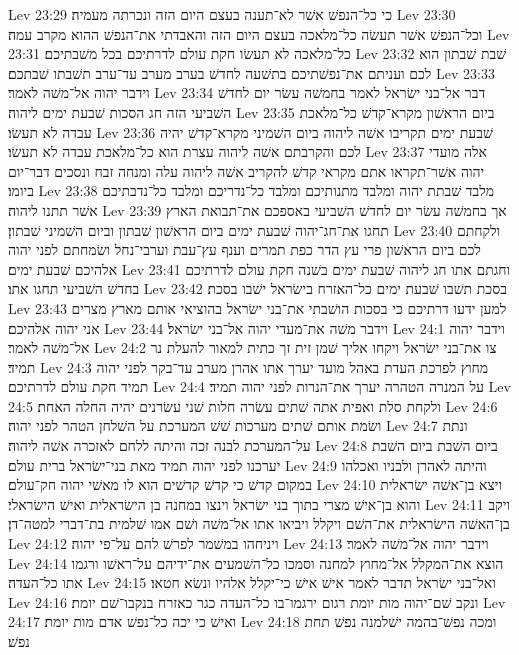 Lev 23:29  כי כל־הנפשׁ אשׁר לא־תענה בעצם היום הזה ונכרתה מעמיה׃
Lev 23:30  וכל־הנפשׁ אשׁר תעשׂה כל־מלאכה בעצם היום הזה והאבדתי את־הנפשׁ ההוא מקרב עמה׃
Lev 23:31  כל־מלאכה לא תעשׂו חקת עולם לדרתיכם בכל משׁבתיכם׃
Lev 23:32  שׁבת שׁבתון הוא לכם ועניתם את־נפשׁתיכם בתשׁעה לחדשׁ בערב מערב עד־ערב תשׁבתו שׁבתכם׃
Lev 23:33  וידבר יהוה אל־משׁה לאמר׃
Lev 23:34  דבר אל־בני ישׂראל לאמר בחמשׁה עשׂר יום לחדשׁ השׁביעי הזה חג הסכות שׁבעת ימים ליהוה׃
Lev 23:35  ביום הראשׁון מקרא־קדשׁ כל־מלאכת עבדה לא תעשׂו׃
Lev 23:36  שׁבעת ימים תקריבו אשׁה ליהוה ביום השׁמיני מקרא־קדשׁ יהיה לכם והקרבתם אשׁה ליהוה עצרת הוא כל־מלאכת עבדה לא תעשׂו׃
Lev 23:37  אלה מועדי יהוה אשׁר־תקראו אתם מקראי קדשׁ להקריב אשׁה ליהוה עלה ומנחה זבח ונסכים דבר־יום ביומו׃
Lev 23:38  מלבד שׁבתת יהוה ומלבד מתנותיכם ומלבד כל־נדריכם ומלבד כל־נדבתיכם אשׁר תתנו ליהוה׃
Lev 23:39  אך בחמשׁה עשׂר יום לחדשׁ השׁביעי באספכם את־תבואת הארץ תחגו את־חג־יהוה שׁבעת ימים ביום הראשׁון שׁבתון וביום השׁמיני שׁבתון׃
Lev 23:40  ולקחתם לכם ביום הראשׁון פרי עץ הדר כפת תמרים וענף עץ־עבת וערבי־נחל ושׂמחתם לפני יהוה אלהיכם שׁבעת ימים׃
Lev 23:41  וחגתם אתו חג ליהוה שׁבעת ימים בשׁנה חקת עולם לדרתיכם בחדשׁ השׁביעי תחגו אתו׃
Lev 23:42  בסכת תשׁבו שׁבעת ימים כל־האזרח בישׂראל ישׁבו בסכת׃
Lev 23:43  למען ידעו דרתיכם כי בסכות הושׁבתי את־בני ישׂראל בהוציאי אותם מארץ מצרים אני יהוה אלהיכם׃
Lev 23:44  וידבר משׁה את־מעדי יהוה אל־בני ישׂראל׃
Lev 24:1  וידבר יהוה אל־משׁה לאמר׃
Lev 24:2  צו את־בני ישׂראל ויקחו אליך שׁמן זית זך כתית למאור להעלת נר תמיד׃
Lev 24:3  מחוץ לפרכת העדת באהל מועד יערך אתו אהרן מערב עד־בקר לפני יהוה תמיד חקת עולם לדרתיכם׃
Lev 24:4  על המנרה הטהרה יערך את־הנרות לפני יהוה תמיד׃
Lev 24:5  ולקחת סלת ואפית אתה שׁתים עשׂרה חלות שׁני עשׂרנים יהיה החלה האחת׃
Lev 24:6  ושׂמת אותם שׁתים מערכות שׁשׁ המערכת על השׁלחן הטהר לפני יהוה׃
Lev 24:7  ונתת על־המערכת לבנה זכה והיתה ללחם לאזכרה אשׁה ליהוה׃
Lev 24:8  ביום השׁבת ביום השׁבת יערכנו לפני יהוה תמיד מאת בני־ישׂראל ברית עולם׃
Lev 24:9  והיתה לאהרן ולבניו ואכלהו במקום קדשׁ כי קדשׁ קדשׁים הוא לו מאשׁי יהוה חק־עולם׃
Lev 24:10  ויצא בן־אשׁה ישׂראלית והוא בן־אישׁ מצרי בתוך בני ישׂראל וינצו במחנה בן הישׂראלית ואישׁ הישׂראלי׃
Lev 24:11  ויקב בן־האשׁה הישׂראלית את־השׁם ויקלל ויביאו אתו אל־משׁה ושׁם אמו שׁלמית בת־דברי למטה־דן׃
Lev 24:12  ויניחהו במשׁמר לפרשׁ להם על־פי יהוה׃
Lev 24:13  וידבר יהוה אל־משׁה לאמר׃
Lev 24:14  הוצא את־המקלל אל־מחוץ למחנה וסמכו כל־השׁמעים את־ידיהם על־ראשׁו ורגמו אתו כל־העדה׃
Lev 24:15  ואל־בני ישׂראל תדבר לאמר אישׁ אישׁ כי־יקלל אלהיו ונשׂא חטאו׃
Lev 24:16  ונקב שׁם־יהוה מות יומת רגום ירגמו־בו כל־העדה כגר כאזרח בנקבו־שׁם יומת׃
Lev 24:17  ואישׁ כי יכה כל־נפשׁ אדם מות יומת׃
Lev 24:18  ומכה נפשׁ־בהמה ישׁלמנה נפשׁ תחת נפשׁ׃
